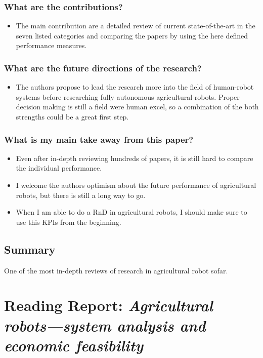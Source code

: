     \subsubsection*{What are the contributions?}
    \begin{itemize}
        \item The main contribution are a detailed review of current state-of-the-art in the seven listed categories and comparing the papers by using the here defined performance measures.
    \end{itemize}
    \subsubsection*{What are the future directions of the research?}
    \begin{itemize}
        \item The authors propose to lead the research more into the field of human-robot systems before researching fully autonomous agricultural robots. Proper decision making is still a field were human excel, so a combination of the both strengths could be a great first step.
    \end{itemize}
    \subsubsection*{What is my main take away from this paper?}
    \begin{itemize}
        \item Even after in-depth reviewing hundreds of papers, it is still hard to compare the individual performance. 
        \item I welcome the authors optimism about the future performance of agricultural robots, but there is still a long way to go.
        \item When I am able to do a RnD in agricultural robots, I should make sure to use this KPIs from the beginning.
    \end{itemize}

    \subsection*{Summary}
    One of the most in-depth reviews of research in agricultural robot sofar.

   \newpage
    \section{Reading Report: \emph{Agricultural robots—system analysis and economic feasibility}}
    \label{sec:Pedersen2006}
    \cite{Pedersen2006}
    
